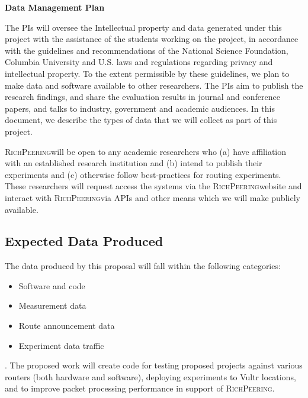 \documentclass[11pt]{article}
\newcommand{\sys}{{\textsc{RichPeering}\xspace}}
\newcommand{\parai}[1]{\smallskip\noindent{\textit {#1}}}
\begin{document}
\begin{center}
{\LARGE \textbf{Data Management Plan}}
\end{center}

\bigskip
\par

The PIs will oversee the Intellectual property and data generated under this project with the assistance of the students working on the project, in accordance with the guidelines and recommendations of the National Science Foundation, Columbia University and U.S. laws and regulations regarding privacy and intellectual property.
To the extent permissible by these guidelines, we plan to make data and software available to other researchers. The PIs aim to publish the research findings, and share the evaluation results in journal and conference papers, and talks to industry, government and academic audiences. In this document, we describe the types of data that we will collect as part of this project. 

\sys will be open to any academic researchers  who (a) have affiliation with an established research institution and (b) intend to publish their experiments and (c) otherwise follow best-practices for routing experiments. These researchers will request access the systems via the \sys website and interact with \sys via APIs and other means which we will make publicly available.  

\subsection*{Expected Data Produced}


The data produced by this proposal will fall within the following categories:

\begin{itemize}
  
  \item Software and code

  \item Measurement data

  \item Route announcement data

  \item Experiment data traffic
    
\end{itemize}

\parai{Software and code}.  The proposed work will create code for testing proposed projects against various routers (both hardware and software), deploying experiments to Vultr locations, and to improve packet processing performance in support of \sys.  
\end{document}

